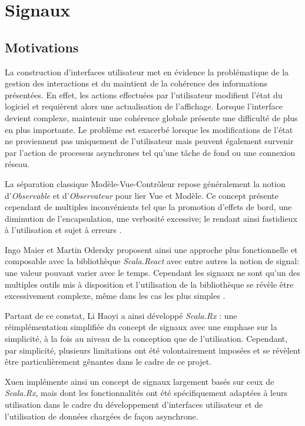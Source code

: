 \chapter{Signaux}

\section{Motivations}

La construction d'interfaces utilisateur met en évidence la problématique de la gestion des interactions et du maintient de la cohérence des informations présentées. En effet, les actions effectuées par l'utilisateur modifient l'état du logiciel et requièrent alors une actualisation de l'affichage. Lorsque l'interface devient complexe, maintenir une cohérence globale présente une difficulté de plus en plus importante. Le problème est exacerbé lorsque les modifications de l'état ne proviennent pas uniquement de l'utilisateur mais peuvent également survenir par l'action de processus asynchrones tel qu'une tâche de fond ou une connexion réseau.

La séparation classique Modèle-Vue-Contrôleur repose généralement la notion d'\emph{Observable} et d'\emph{Observateur} pour lier Vue et Modèle. Ce concept présente cependant de multiples inconvénients tel que la promotion d'effets de bord, une diminution de l'encapsulation, une verbosité excessive; le rendant ainsi fastidieux à l'utilisation et sujet à erreurs \cite{odersky2012}.

Ingo Maier et Martin Odersky proposent ainsi une approche plus fonctionnelle et composable avec la bibliothèque \emph{Scala.React} \cite{scala-react} avec entre autres la notion de signal: une valeur pouvant varier avec le temps. Cependant les signaux ne sont qu'un des multiples outils mis à disposition et l'utilisation de la bibliothèque se révèle être excessivement complexe, même dans les cas les plus simples \cite[\small Related~Work]{scala.rx}.

Partant de ce constat, Li Haoyi a ainsi développé \emph{Scala.Rx} \cite{scala.rx}: une réimplémentation simplifiée du concept de signaux avec une emphase sur la simplicité, à la fois au niveau de la conception que de l'utilisation. Cependant, par simplicité, plusieurs limitations ont été volontairement imposées et se révèlent être particulièrement gênantes dans le cadre de ce projet.

Xuen implémente ainsi un concept de signaux largement basés sur ceux de \emph{Scala.Rx}, mais dont les fonctionnalités ont été spécifiquement adaptées à leurs utilisation dans le cadre du développement d'interfaces utilisateur et de l'utilisation de données chargées de façon asynchrone.






